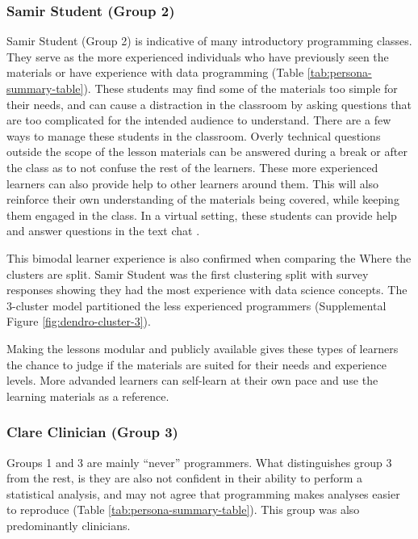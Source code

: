 \documentclass[020-persona\_validation.tex]{subfiles}
\begin{document}
        \subsubsection{Samir Student (Group 2)}

            Samir Student (Group 2) is indicative of many introductory programming classes.
            They serve as the more experienced individuals who have previously seen the materials
            or have experience with data programming (Table \ref{tab:persona-summary-table}).
            These students may find some of the materials too simple for their needs,
            and can cause a distraction in the classroom by asking questions that are too complicated
            for the intended audience to understand.
            There are a few ways to manage these students in the classroom.
            Overly technical questions outside the scope of the lesson materials
            can be answered during a break or after the class as to not confuse the rest of the learners.
            These more experienced learners can also provide help to other learners around them.
            This will also reinforce their own understanding of the materials being covered,
            while keeping them engaged in the class.
            In a virtual setting,
            these students can provide help and answer questions in the text chat
            \cite{Koch2016, wilson2019teaching}.

            This bimodal learner experience is also confirmed when comparing the
            Where the clusters are split.
            Samir Student was the first clustering split with survey responses showing
            they had the most experience with data science concepts.
            The 3-cluster model partitioned the less experienced programmers
            (Supplemental Figure \ref{fig:dendro-cluster-3}).

            Making the lessons modular and publicly available
            gives these types of learners the chance to judge if the materials are suited for their needs
            and experience levels.
            More advanded learners can self-learn at their own pace and use the learning materials as a reference.

        \subsubsection{Clare Clinician (Group 3)}

            Groups 1 and 3 are mainly ``never'' programmers.
            What distinguishes group 3 from the rest, is they are also not confident in
            their ability to perform a statistical analysis,
            and may not agree that programming makes analyses easier to reproduce (Table \ref{tab:persona-summary-table}).
            This group was also predominantly clinicians.
\end{document}
